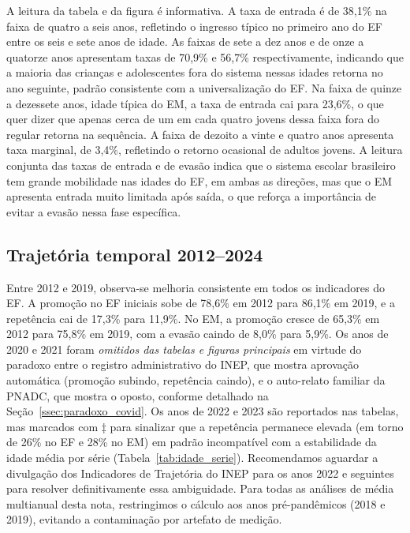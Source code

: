 A leitura da tabela e da figura é informativa. A taxa de entrada
é de 38,1\% na faixa de quatro a seis anos, refletindo o
ingresso típico no primeiro ano do EF entre os seis e sete anos
de idade. As faixas de sete a dez anos e de onze a quatorze anos
apresentam taxas de 70,9\% e 56,7\% respectivamente, indicando
que a maioria das crianças e adolescentes fora do sistema nessas
idades retorna no ano seguinte, padrão consistente com a
universalização do EF. Na faixa de quinze a dezessete anos,
idade típica do EM, a taxa de entrada cai para 23,6\%, o que
quer dizer que apenas cerca de um em cada quatro jovens dessa
faixa fora do regular retorna na sequência. A faixa de dezoito a
vinte e quatro anos apresenta taxa marginal, de 3,4\%, refletindo
o retorno ocasional de adultos jovens. A leitura conjunta das
taxas de entrada e de evasão indica que o sistema escolar
brasileiro tem grande mobilidade nas idades do EF, em ambas as
direções, mas que o EM apresenta entrada muito limitada após
saída, o que reforça a importância de evitar a evasão nessa
fase específica.

\subsection{Trajetória temporal 2012--2024}

Entre 2012 e 2019, observa-se melhoria consistente em todos
os indicadores do EF. A promoção no EF iniciais sobe de
78,6\% em 2012 para 86,1\% em 2019, e a repetência cai de
17,3\% para 11,9\%. No EM, a promoção cresce de 65,3\% em
2012 para 75,8\% em 2019, com a evasão caindo de 8,0\% para
5,9\%. Os anos de 2020 e 2021 foram \emph{omitidos das
tabelas e figuras principais} em virtude do paradoxo entre o
registro administrativo do INEP, que mostra aprovação
automática (promoção subindo, repetência caindo), e o
auto-relato familiar da PNADC, que mostra o oposto, conforme
detalhado na Seção~\ref{ssec:paradoxo_covid}. Os anos de
2022 e 2023 são reportados nas tabelas, mas marcados com
$\ddagger$ para sinalizar que a repetência permanece elevada
(em torno de 26\% no EF e 28\% no EM) em padrão incompatível
com a estabilidade da idade média por série
(Tabela~\ref{tab:idade_serie}). Recomendamos aguardar a
divulgação dos Indicadores de Trajetória do INEP para os
anos 2022 e seguintes para resolver definitivamente essa
ambiguidade. Para todas as análises de média multianual
desta nota, restringimos o cálculo aos anos pré-pandêmicos
(2018 e 2019), evitando a contaminação por artefato de
medição.

